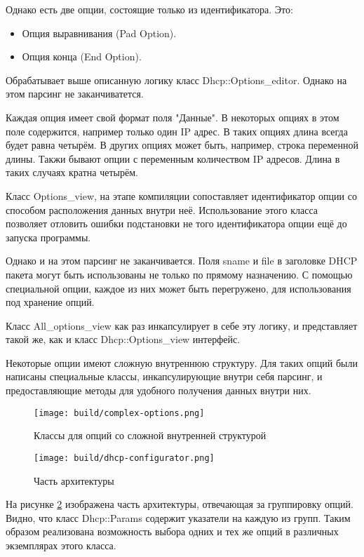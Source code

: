 \documentclass[14pt,a4paper]{extarticle}
\begin{document}
Однако есть две опции, состоящие только из идентификатора. Это:
\begin{itemize}
    \item Опция выравнивания (Pad Option).
    \item Опция конца (End Option).
\end{itemize}

Обрабатывает выше описанную логику класс Dhcp::Options\_editor. Однако на этом парсинг не заканчиватется.

Каждая опция имеет свой формат поля "Данные". В некоторых опциях в этом поле содержится, например только один IP адрес. В таких опциях длина всегда будет равна четырём. В других опциях может быть, например, строка переменной длины. Такжи бывают опции с переменным количеством IP адресов. Длина в таких случаях кратна четырём.

Класс Options\_view, на этапе компиляции сопоставляет идентификатор опции со способом расположения данных внутри неё. Использование этого класса позволяет отловить ошибки подстановки не того идентификатора опции ещё до запуска программы.

Однако и на этом парсинг не заканчивается.
Поля sname и file в заголовке DHCP пакета могут быть использованы не только по прямому назначению. С помощью специальной опции, каждое из них может быть перегружено, для использования под хранение опций.

Класс All\_options\_view как раз инкапсулирует в себе эту логику, и представляет такой же, как и класс Dhcp::Options\_view интерфейс.

Некоторые опции имеют сложную внутреннюю структуру. Для таких опций были написаны специальные классы, инкапсулирующие внутри себя парсинг, и предоставляющие методы для удобного получения данных внутри них.

\begin{figure}[H]
    \centering
    \texttt{[image: build/complex-options.png]}
    \caption{Классы для опций со сложной внутренней структурой}
    \label{fig:complex_options}
\end{figure}

\begin{figure}[H]
    \texttt{[image: build/dhcp-configurator.png]}
    \caption{Часть архитектуры}
    \label{fig:profiles}
\end{figure}

На рисунке \ref{fig:profiles} изображена часть архитектуры, отвечающая за группировку опций.
Видно, что класс Dhcp::Params содержит указатели на каждую из групп. Таким образом реализована возможность выбора одних и тех же опций в различных экземплярах этого класса.
\end{document}

